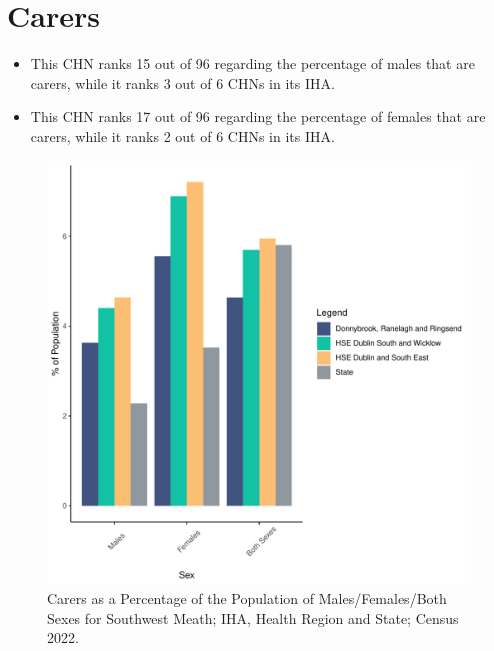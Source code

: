 \documentclass{article}
\begin{document}
\section{Carers}\label{sect:Carers}
\begin{itemize}
\item This CHN ranks  15 out of 96 regarding the percentage of males that are carers, while it ranks   3 out of 6 CHNs in its IHA.
\item This CHN ranks  17 out of 96 regarding the percentage of females that are carers, while it ranks   2 out of 6 CHNs in its IHA.
\end{itemize}
\begin{figure}[H]
	\centering
	\includegraphics[width = 150mm]{../figures/CareED.pdf}
	\caption{Carers as a Percentage of the Population of Males/Females/Both Sexes for Southwest Meath; IHA, Health Region and State; Census 2022.}
	\label{fig:2ae19629-1a6a-13a3-e055-000000000001}
	\end{figure}
\end{document}
